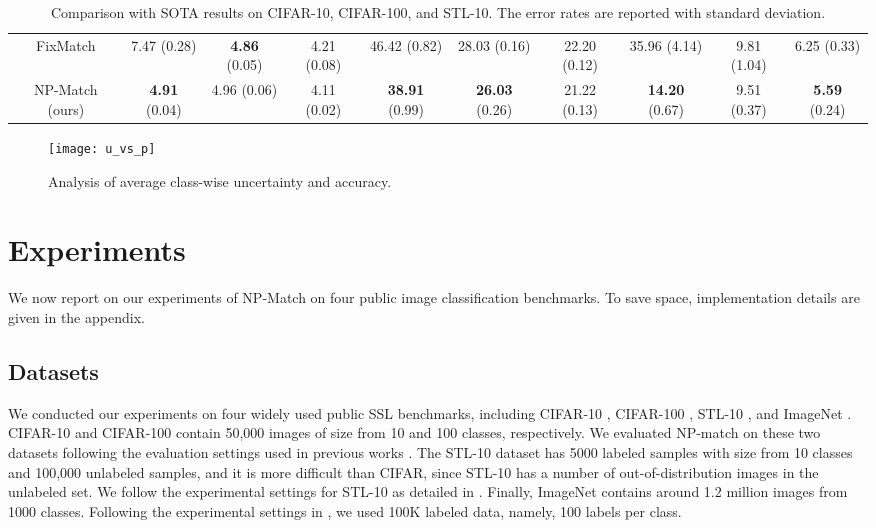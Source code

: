 \documentclass[nohyperref]{article}
\theoremstyle{plain}
\theoremstyle{definition}
\theoremstyle{remark}
\begin{document}
\begin{table*}
{\begin{tabular}{@{}cccccccccc@{}}
 \quad FixMatch \cite{sohn2020fixmatch}  &   7.47 {\small(0.28)} &  {\bf 4.86} {\small(0.05)} &  4.21 {\small(0.08)} &  46.42 {\small(0.82)}  & 28.03 {\small(0.16)} & 22.20 {\small(0.12)}  & 35.96 {\small(4.14)} & 9.81 {\small(1.04)} &   6.25  {\small(0.33)} \\
 \quad NP-Match (ours) &  {\bf 4.91} {\small(0.04)} &  4.96 {\small(0.06)} &  4.11 {\small(0.02)} & {\bf 38.91} {\small(0.99)}  & {\bf 26.03} {\small(0.26)} & 21.22 {\small(0.13)}  & {\bf 14.20} {\small(0.67)} & 9.51 {\small(0.37)} & {\bf 5.59}  {\small(0.24)}\\
  \bottomrule[1pt]
  \end{tabular}} 
 \caption{Comparison with SOTA results on CIFAR-10, CIFAR-100, and STL-10. The error rates are reported with standard deviation. } 
 \label{tab:compare_sota} 
 \end{table*}
 
 \begin{figure*}[t]
\centering
\texttt{[image: u\_vs\_p]}
\vspace{-5ex}
\caption{Analysis of average class-wise uncertainty and accuracy.}
\label{fig:u_vs_p} 
\end{figure*}
 
\section{Experiments}
\label{sec:experiment}
We now report on our experiments of NP-Match on four public image classification benchmarks. To save space, implementation details are given in the appendix. 

\subsection{Datasets}
We conducted our experiments on four widely used public SSL benchmarks, including CIFAR-10 \cite{krizhevsky2009learning}, CIFAR-100 \cite{krizhevsky2009learning}, STL-10 \cite{coates2011analysis}, and ImageNet \cite{deng2009imagenet}. CIFAR-10 and CIFAR-100 contain 50,000 images of size  from 10 and 100 classes, respectively. We evaluated NP-match on these two datasets following the evaluation settings used in previous works \cite{sohn2020fixmatch, zhang2021flexmatch, li2021comatch}.
The STL-10 dataset has 5000 labeled samples with size  from 10 classes and 100,000 unlabeled samples, and it is more difficult than CIFAR,  since STL-10  has a number of out-of-distribution images in the unlabeled set. We follow the experimental settings for STL-10 as detailed in \cite{zhang2021flexmatch}. Finally, ImageNet contains around 1.2 million images from 1000 classes. Following the experimental settings in \cite{zhang2021flexmatch}, we used 100K labeled data, namely, 100 labels per class. 
\end{document}
